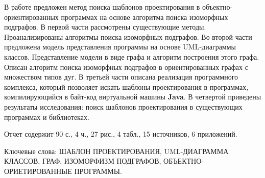 \Referat

В работе предложен метод поиска шаблонов проектирования в объектно-ориентированных
программах на основе алгоритма поиска изоморфных подграфов.
В первой части рассмотрены существующие методы.
Проанализированы алгоритмы поиска изоморфных подграфов.
Во второй части предложена модель представления программы на основе UML-диаграммы классов.
Представление модели в виде графа и алгоритм построения этого графа.
Описан алгоритм поиска изоморфных подграфов в ориентированных графах с множеством
типов дуг.
В третьей части описана реализация программного комплекса, который позволяет
искать шаблоны проектирования в программах, компилирующийся в байт-код
виртуальной машины \textbf{Java}.
В четвертой приведены результаты исследования: поиск шаблонов проектирования
в существующих программах и библиотеках.

Отчет содержит 90 с., 4 ч., 27 рис., 4 табл., 15 источников, 6 приложений.

Ключевые слова: ШАБЛОН ПРОЕКТИРОВАНИЯ, UML-ДИАГРАММА КЛАССОВ, ГРАФ,
ИЗОМОРФИЗМ ПОДГРАФОВ, ОБЪЕКТНО-ОРИЕТИРОВАННЫЕ ПРОГРАММЫ.
